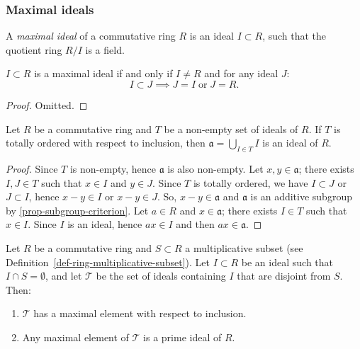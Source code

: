 \documentclass[12pt]{report}
\begin{document}
\subsubsection{Maximal ideals}

\begin{definition} \label{def-ring-maximal-ideal}
    A \emph{maximal ideal} of a commutative ring $R$ is an ideal $I \subset R$, such that the quotient ring $R / I$ is a field.
\end{definition}

\begin{proposition} \label{prop-ring-maximal-ideal-eq}
    $I \subset R$ is a maximal ideal if and only if $I \neq R$ and for any ideal $J$:
    \[
        I \subset J \implies J = I \; \text{or} \; J = R.
    \]
\end{proposition}

\begin{proof}
    Omitted.
\end{proof}

\begin{lemma} \label{lem-union-totally-ordered-ideals}
    Let $R$ be a commutative ring and $T$ be a non-empty set of ideals of $R$. If $T$ is totally ordered with respect to inclusion, then $\mathfrak{a} = \bigcup_{I \in T} I$ is an ideal of $R$.
\end{lemma}

\begin{proof}
    Since $T$ is non-empty, hence $\mathfrak{a}$ is also non-empty. Let $x, y \in \mathfrak{a}$; there exists $I, J \in T$ such that $x \in I$ and $y \in J$. Since $T$ is totally ordered, we have $I \subset J$ or $J \subset I$, hence $x - y \in I$ or $x - y \in J$. So, $x - y \in \mathfrak{a}$ and $\mathfrak{a}$ is an additive subgroup by \ref{prop-subgroup-criterion}. Let $a \in R$ and $x \in \mathfrak{a}$; there exists $I \in T$ such that $x \in I$. Since $I$ is an ideal, hence $a x \in I$ and then $a x \in \mathfrak{a}$.
\end{proof}

\begin{lemma} \label{lem-prime-ideal-avoiding-multiplicative-subset}
    Let $R$ be a commutative ring and $S \subset R$ a multiplicative subset (see Definition~\ref{def-ring-multiplicative-subset}). Let $I \subset R$ be an ideal such that $I \cap S = \emptyset$, and let $\mathcal{T}$ be the set of ideals containing $I$ that are disjoint from $S$. Then:
    \begin{enumerate}[label=(\roman*)]
        \item $\mathcal{T}$ has a maximal element with respect to inclusion.
        \item Any maximal element of $\mathcal{T}$ is a prime ideal of $R$.
    \end{enumerate}
\end{lemma}
\end{document}
